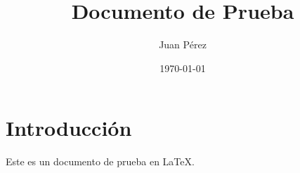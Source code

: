\documentclass{article}
\begin{document}
\title{Documento de Prueba}
\author{Juan Pérez}
\date{\today}
\maketitle

\section{Introducción}
Este es un documento de prueba en \LaTeX.
\end{document}

